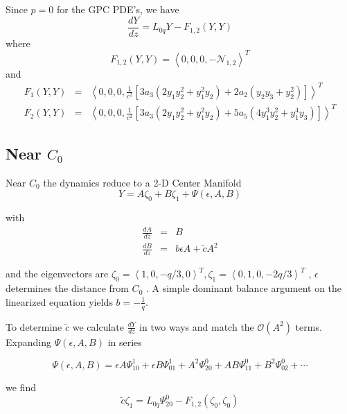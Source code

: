 Since $p=0$ for the GPC PDE's, we have 
\begin{equation} 
 \frac{ dY }{ dz } = L_{0q} Y - F_{1,2}(Y,Y) 
\end{equation}
where 
\begin{equation}
F_{1,2}(Y,Y) = \left<0,0,0,-\mathcal{N}_{1,2} \right>^T
\end{equation}
and
\begin{subequations}
\begin{eqnarray}
F_1(Y,Y) &=& \left<0,0,0,\frac{1}{c^2}\left[ 3 a_3 \left( 2 y_1 y_2^2 + y_1^2 y_2\right)+ 2 a_2 \left( y_2 y_3  + y_2^2\right)  \right]\right>^T\\
F_2(Y,Y) &=& \left<0,0,0,\frac{1}{c^2}\left[ 3 a_3 \left( 2 y_1 y_2^2 + y_1^2 y_2\right)+ 5 a_5 \left(4 y_1^3 y_2^2 +  y_1^4 y_3 \right) \right]\right>^T
\end{eqnarray}
\end{subequations}

\subsection{ Near $C_0$ }
Near $C_0$ the dynamics reduce to a 2-D Center Manifold
\begin{equation} Y = A \zeta_0 + B \zeta_1 + \Psi(\epsilon,A,B)
\end{equation}

with 
\begin{subequations}
\begin{eqnarray}
\frac{dA}{dz} &=& B \\
\frac{dB}{dz} &=& b \epsilon A + \tilde{c} A^2
\end{eqnarray}
\end{subequations}


and the eigenvectors are $\zeta_0 = \left<1,0,-q/3,0\right>^T, \zeta_1 = \left<0,1,0,-2 q/3\right>^T $ , $\epsilon$ determines the distance from $C_0$ .
A simple dominant balance argument on the linearized equation yields $b=-\frac{1}{q}$.


To determine $\tilde{c}$ we calculate $\frac{dY}{dz}$ in two ways and match the $\mathcal{O}(A^2)$ terms. Expanding $\Psi(\epsilon,A,B)$ in series 

\begin{equation}
\Psi(\epsilon,A,B) = \epsilon A \Psi_{10}^1 + \epsilon B \Psi_{01}^1 + A^2 \Psi_{20}^0 + A B \Psi_{11}^0 + B^2 \Psi_{02}^0 + \cdots
\end{equation}

we find \begin{equation} \tilde{c} \zeta_1 = L_{0q} \Psi_{20}^0 - F_{1,2}(\zeta_0,\zeta_0) \end{equation}

